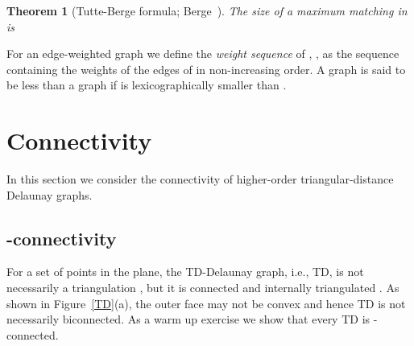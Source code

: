 \documentclass[11pt,a4paper]{article}
\newcommand{\kTD}[2]{\text{-}TD#2}
\newcommand{\WS}[1]{\text{WS}}
\newtheorem{theorem}{Theorem}
\begin{document}
\begin{theorem}[Tutte-Berge formula; Berge~\cite{Berge1958}] 
\label{Berge} 
The size of a maximum matching in  is 
\end{theorem}

For an edge-weighted graph  we define the {\em weight sequence} of , \WS{G}, as the sequence containing the weights of the edges of  in non-increasing order. A graph  is said to be less than a graph  if \WS{G_1} is lexicographically smaller than \WS{G_2}.

\section{Connectivity}
\label{connectivity}
In this section we consider the connectivity of higher-order triangular-distance Delaunay graphs.

\subsection{-connectivity}
\label{connectivity-k-plus-1}
For a set  of points in the plane, the TD-Delaunay graph, i.e., \kTD{0}{}, is not necessarily a triangulation \cite{Chew1989}, but it is connected and internally triangulated \cite{Babu2013}. As shown in Figure~\ref{TD}(a), the outer face may not be convex and hence \kTD{0}{} is not necessarily biconnected. As a warm up exercise we show that every \kTD{k}{} is -connected. 
\end{document}
